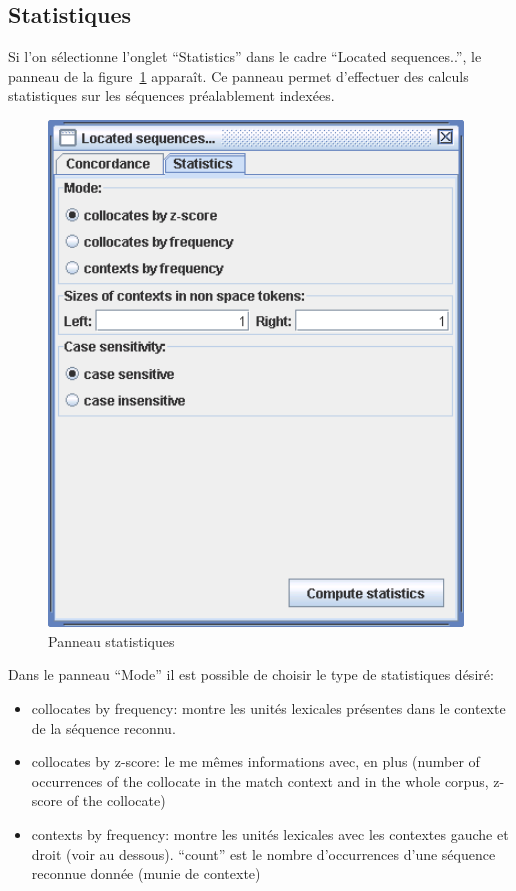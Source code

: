 \clearpage
\subsection{Statistiques}
\label{section-statistics}
Si l'on sélectionne l'onglet ``Statistics'' dans le cadre ``Located sequences..'',
le panneau de la figure~\ref{fig-statistics} apparaît. Ce panneau permet d'effectuer des calculs
statistiques sur les séquences préalablement indexées.

\bigskip
\begin{figure}[!ht]
\begin{center}
\includegraphics[width=11cm]{resources/img/fig4-9.png}
\caption{Panneau statistiques \label{fig-statistics}}
\end{center}
\end{figure}

\bigskip
\noindent Dans le panneau ``Mode'' il est possible de choisir le type de statistiques désiré:
\begin{itemize}
  \item collocates by frequency: montre les unités lexicales présentes dans le contexte de la
  	  séquence reconnu.
  \item collocates by z-score: le me mêmes informations avec, en plus (number of occurrences of the collocate in the match context and
  in the whole corpus, z-score of the collocate)
  \item contexts by frequency: montre les unités lexicales avec les contextes gauche et droit
  	  (voir au dessous). ``count'' est le nombre d'occurrences d'une séquence reconnue donnée
  	  (munie de contexte)
\end{itemize}

